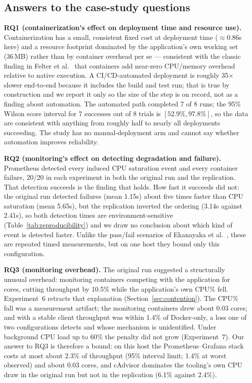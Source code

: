 \documentclass[conference]{IEEEtran}
\begin{document}
\subsection{Answers to the case-study questions}

\textbf{RQ1 (containerization's effect on deployment time and resource
use).} Containerization has a small, consistent fixed cost at deployment
time ($\approx$0.86s here) and a resource footprint dominated by the
application's own working set (36\,MB) rather than by container overhead
per se --- consistent with the classic finding in
Felter et al.~\cite{felter2015} that containers add near-zero CPU/memory
overhead relative to native execution. A CI/CD-automated deployment is
roughly 35$\times$ slower end-to-end because it includes the build and test run; that is
true by construction and we report it only so the size of the step is on record, not as
a finding about automation. The automated path completed 7 of 8 runs; the 95\% Wilson
score interval for 7 successes out of 8 trials is $[52.9\%, 97.8\%]$, so the data are
consistent with anything from roughly half to nearly all deployments succeeding. The study
has no manual-deployment arm and cannot say whether automation improves reliability.

\textbf{RQ2 (monitoring's effect on detecting degradation and failure).}
Prometheus detected every induced CPU saturation event and every container
failure, 20/20 in each experiment in both the original run and the replication. That
detection succeeds is the finding that holds. How fast it succeeds did not: the original
run detected failures (mean 1.15s) about five times faster than CPU saturation (mean
5.65s), but the replication inverted the ordering (3.14s against 2.41s), so both
detection times are environment-sensitive (Table~\ref{tab:reproducibility}) and we draw
no conclusion about which kind of event is detected faster. Unlike the pass/fail
scenarios of Ekanayaka et al.~\cite{ekanayaka2023}, these are repeated timed
measurements, but on one host they bound only this configuration.

\textbf{RQ3 (monitoring overhead).} The original run suggested a structurally
unusual overhead: monitoring containers competing with the application for
cores, cutting throughput by 10.5\% while the application's own CPU\% fell. Experiment~6
retracts that explanation (Section~\ref{sec:contention}). The CPU\% fall was a
measurement artifact; the monitoring containers drew about 0.03 cores; and with a
stable client throughput was within 1.4\% of Docker-only, a loss one of two
configurations detects and whose mechanism is unidentified. Under background CPU load up
to 60\% the penalty did not grow (Experiment~7). Our answer to RQ3 is therefore a
bound: on this host the Prometheus--Grafana stack costs at most about 2.3\% of
throughput (95\% interval limit; 1.4\% at worst observed) and about 0.03 cores, and cAdvisor dominates the tooling's own CPU draw in
the original run but not in the replication (6.1\% against 2.4\%).
\end{document}
